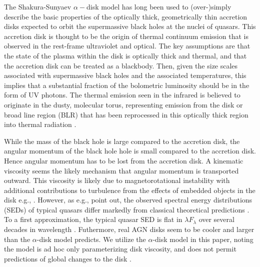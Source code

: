 \documentclass{nature}
\begin{document}
The Shakura-Sunyaev $\alpha-$disk model \cite{SS73} has long been used to (over-)simply describe the basic properties of the optically thick, geometrically thin accretion disks expected to orbit the supermassive black holes at the nuclei of quasars.  This accretion disk is thought to be the origin of thermal continuum emission that is observed in the rest-frame ultraviolet and optical.  The key assumptions are that the state of the plasma within the disk is optically thick and thermal, and that the accretion disk can be treated as a blackbody. Then, given the size scales associated with supermassive black holes and the associated temperatures, this implies that a substantial fraction of the bolometric luminosity should be in the form of UV photons. The thermal emission seen in the infrared is believed to originate in the dusty, molecular torus, representing emission from the disk or broad line region (BLR) that has been reprocessed in this optically thick region into thermal radiation \citep[see ][for reviews]{Antonucci1993, Perlman2008, Lasota2016}.

While the mass of the black hole is large compared to the accretion disk, the angular momentum of the black hole hole is small compared to the accretion disk.  Hence angular momentum has to be lost from the accretion disk.  A kinematic viscosity seems the likely mechanism that angular momentum is transported outward.  This viscosity is likely due to magnetorotational instability \citep[MRI; ][]{Balbus_Hawley1991} with additional contributions to turbulence from the effects of embedded objects in the disk e.g., \cite{McKernan2014}.  However, as e.g., \cite{Koratkar_Blaes1999, Sirko_Goodman2003} point out, the observed spectral energy distributions (SEDs) of typical quasars differ markedly from classical theoretical predictions \citep[in which the disc is assumed to be geometrically thin, optically thick, steady  and heated solely by viscous dissipation, e.g., ][]{SS73, Pringle1981}. To a first approximation, the typical quasar SED is flat in $\lambda F_{\lambda}$ over several decades in wavelength \citep{Elvis1994, Richards2006b}. Futhermore, real AGN disks seem to be cooler \cite[e.g., ][]{Lawrence2012} and larger \cite[e.g.,][]{Pooley2007, Morgan2010, Morgan2012, Mosquera2011} than the $\alpha$-disk model predicts. We utilize the $\alpha$-disk model in this paper, noting the model is ad hoc only parameterizing disk viscosity, and does not permit predictions of global changes to the disk \cite{King2012}. 
\end{document}
